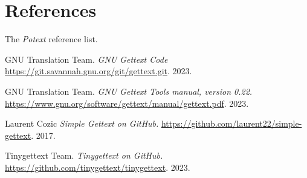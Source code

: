 %
%
%

\section{References}
\label{sec:references}

   The \textsl{Potext} reference list.

{\RaggedRight
\begin{thebibliography}{99}

   GNU Translation Team.
   \emph{GNU Gettext Code}
	\url{https://git.savannah.gnu.org/git/gettext.git}.
   2023.

   GNU Translation Team.
   \emph{GNU Gettext Tools manual, version 0.22.}
   \url{https://www.gnu.org/software/gettext/manual/gettext.pdf}.
   2023.

   Laurent Cozic
   \emph{Simple Gettext on GitHub.}
   \url{https://github.com/laurent22/simple-gettext}.
   2017.

   Tinygettext Team.
   \emph{Tinygettext on GitHub.}
   \url{https://github.com/tinygettext/tinygettext}.
   2023.

\end{thebibliography}
}

